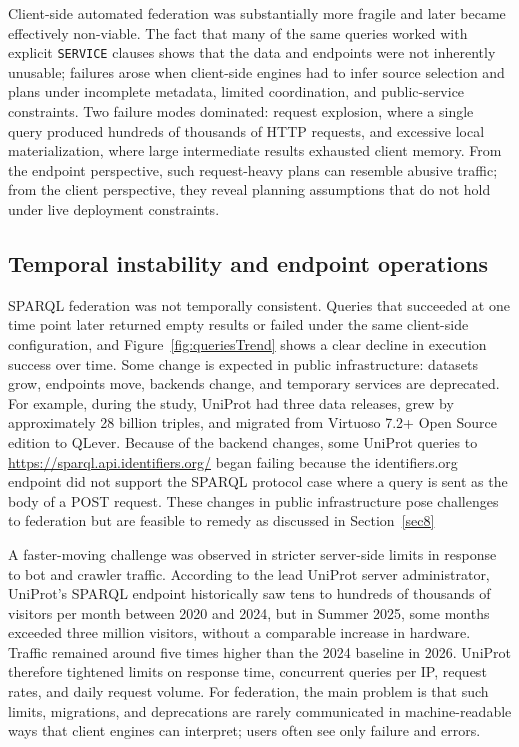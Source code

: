 \documentclass[runningheads]{llncs}
\begin{document}
Client-side automated federation was substantially more fragile and later became effectively non-viable. 
The fact that many of the same queries worked with explicit \texttt{SERVICE} clauses shows that the data and endpoints were not inherently unusable; failures arose when client-side engines had to infer source selection and plans under incomplete metadata, limited coordination, and public-service constraints. 
Two failure modes dominated: request explosion, where a single query produced hundreds of thousands of HTTP requests, and excessive local materialization, where large intermediate results exhausted client memory. 
From the endpoint perspective, such request-heavy plans can resemble abusive traffic; from the client perspective, they reveal planning assumptions that do not hold under live deployment constraints.

\subsection{Temporal instability and endpoint operations}\label{sec6.2}
SPARQL federation was not temporally consistent. 
Queries that succeeded at one time point later returned empty results or failed under the same client-side configuration, and Figure~\ref{fig:queriesTrend} shows a clear decline in execution success over time. 
Some change is expected in public infrastructure: datasets grow, endpoints move, backends change, and temporary services are deprecated. 
For example, during the study, UniProt had three data releases, grew by approximately 28 billion triples, and migrated from Virtuoso 7.2+ Open Source edition to QLever.  
Because of the backend changes, some UniProt queries to \url{https://sparql.api.identifiers.org/} began failing because the identifiers.org endpoint did not support the SPARQL protocol case where a query is sent as the body of a POST request.
These changes in public infrastructure pose challenges to federation but are feasible to remedy as discussed in Section~\ref{sec8}

A faster-moving challenge was observed in stricter server-side limits in response to bot and crawler traffic. 
According to the lead UniProt server administrator, UniProt's SPARQL endpoint historically saw tens to hundreds of thousands of visitors per month between 2020 and 2024, but in Summer 2025, some months exceeded three million visitors, without a comparable increase in hardware. 
Traffic remained around five times higher than the 2024 baseline in 2026. 
UniProt therefore tightened limits on response time, concurrent queries per IP, request rates, and daily request volume. 
For federation, the main problem is that such limits, migrations, and deprecations are rarely communicated in machine-readable ways that client engines can interpret; users often see only failure and errors.
\end{document}
